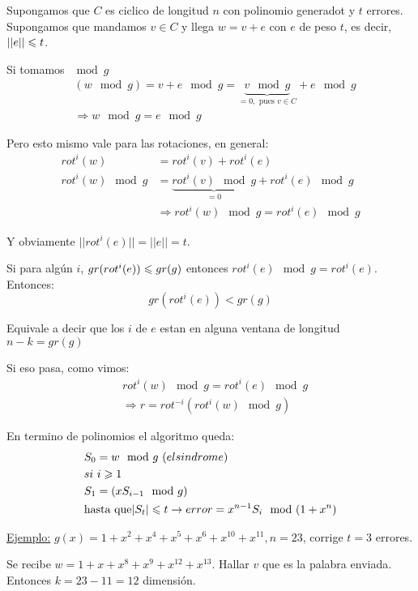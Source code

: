 \documentclass[12pt,a4paper]{article}
\begin{document}
Supongamos que $C$ es ciclico de longitud $n$ con polinomio generadot y $t$ errores. 
Supongamos que mandamos $v \in C$ y llega $w = v + e$ con $e$ de peso $t$, es decir, 
$||e|| \leqslant t$.
\medskip

Si tomamos $\mod g$
\begin{align*}
    &(w \mod g) = v + e \mod g = \underbrace{v \mod g}_{=0,\,\, \text{pues $v\in C$}} + e \mod g \\
    &\Rightarrow w \mod g = e \mod g
\end{align*}

Pero esto mismo vale para las rotaciones, en general:
\begin{align*}
    rot^{i}(w) &= rot^{i}(v) + rot^{i}(e) \\
    rot^{i}(w) \mod g &= \underbrace{rot^{i}(v) \mod g}_{=0} + rot^{i}(e) \mod g \\
    &\Rightarrow rot^{i}(w) \mod g = rot^{i}(e) \mod g
\end{align*}

Y obviamente $||rot^{i}(e)|| = ||e|| = t$.
\medskip

Si para algún $i$, $gr(rot^{i}(e)) \leqslant gr(g)$ entonces $rot^{i}(e) \mod g = rot^{i}(e)$. Entonces:
$$gr(rot^{i}(e)) < gr(g)$$

Equivale a decir que los $i$ de $e$ estan en alguna ventana de longitud $n-k = gr(g)$
\medskip

Si eso pasa, como vimos:
\begin{align*}
    &rot^{i}(w) \mod g = rot^{i}(e) \mod g\\
    &\Rightarrow r = rot^{-i}(rot^{i}(w) \mod g)
\end{align*}

En termino de polinomios el algoritmo queda:
\begin{align*}
    &S_{0} = w \mod g\,\, (el sindrome)\\
    &si\,\, i\geqslant1 \\
    &S_{1} = (xS_{i-1} \mod g)\\
    &\text{hasta que} |S_{t}| \leqslant t \to error=x^{n-1}S_{i} \mod (1+x^{n})\\
\end{align*}

\underline{Ejemplo:} $g(x) = 1 + x^{2} + x^{4} + x^{5} + x^{6} + x^{10} + x^{11}, n =23$,
corrige $t=3$ errores.
\medskip

Se recibe $w = 1 + x + x^{8} + x^{9} + x^{12} + x^{13}$. Hallar $v$ que es la palabra enviada. 
Entonces $k = 23-11 =12$ dimensión.
\end{document}

